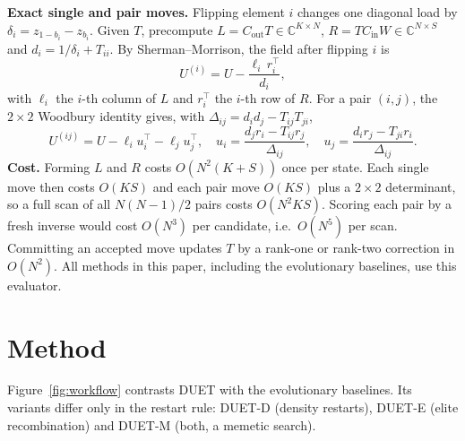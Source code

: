 \documentclass[runningheads]{llncs}
\newcommand{\duet}{\mbox{DUET}}\newcommand{\duetD}{\mbox{DUET-D}}\newcommand{\duetE}{\mbox{DUET-E}}
\newcommand{\bts}{\mbox{DUET-M}}
\begin{document}
\textbf{Exact single and pair moves.} Flipping element $i$ changes one diagonal load by $\delta_i=z_{1-b_i}-z_{b_i}$. Given $T$, precompute $L=C_{\mathrm{out}}T\in\mathbb C^{K\times N}$, $R=TC_{\mathrm{in}}W\in\mathbb C^{N\times S}$ and $d_i=1/\delta_i+T_{ii}$. By Sherman--Morrison, the field after flipping $i$ is
\begin{equation}
U^{(i)}=U-\frac{\ell_i\,r_i^{\top}}{d_i},
\end{equation}
with $\ell_i$ the $i$-th column of $L$ and $r_i^\top$ the $i$-th row of $R$. For a pair $(i,j)$, the $2\times2$ Woodbury identity gives, with $\Delta_{ij}=d_id_j-T_{ij}T_{ji}$,
\begin{equation}
U^{(ij)}=U-\ell_i u_i^{\top}-\ell_j u_j^{\top},\quad u_i=\frac{d_jr_i-T_{ij}r_j}{\Delta_{ij}},\quad u_j=\frac{d_ir_j-T_{ji}r_i}{\Delta_{ij}}.
\label{eq:pair}
\end{equation}
\textbf{Cost.} Forming $L$ and $R$ costs $O(N^2(K+S))$ once per state. Each single move then costs $O(KS)$ and each pair move $O(KS)$ plus a $2\times2$ determinant, so a full scan of all $N(N-1)/2$ pairs costs $O(N^2KS)$. Scoring each pair by a fresh inverse would cost $O(N^3)$ per candidate, i.e.\ $O(N^5)$ per scan. Committing an accepted move updates $T$ by a rank-one or rank-two correction in $O(N^2)$. All methods in this paper, including the evolutionary baselines, use this evaluator.

\section{Method}\label{sec:method}
Figure~\ref{fig:workflow} contrasts \duet{} with the evolutionary baselines. Its variants differ only in the restart rule: \duetD{} (density restarts), \duetE{} (elite recombination) and \bts{} (both, a memetic search).
\end{document}
